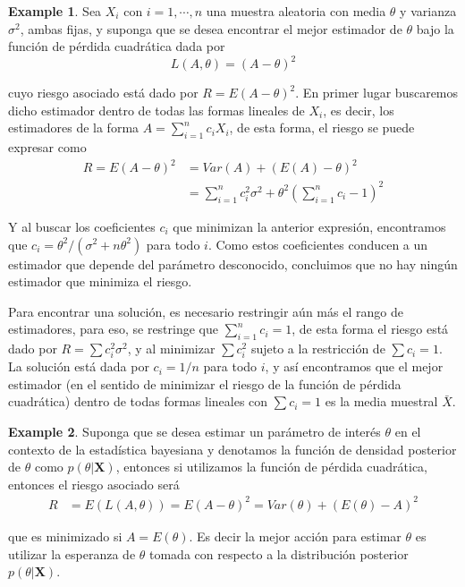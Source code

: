 \documentclass[
  spanish,
  letter]{book}
\theoremstyle{definition}
\theoremstyle{definition}
\newtheorem{example}{Example}[chapter]
\theoremstyle{definition}
\theoremstyle{remark}
\begin{document}
\begin{example}
\protect\hypertarget{exm:unnamed-chunk-1}{}{\label{exm:unnamed-chunk-1} }Sea \(X_i\) con \(i=1,\cdots, n\) una muestra aleatoria con media \(\theta\) y varianza \(\sigma^2\), ambas fijas, y suponga que se desea encontrar el mejor estimador de \(\theta\) bajo la función de pérdida cuadrática dada por
\begin{equation*}
L(A,\theta)=(A-\theta)^2
\end{equation*}

cuyo riesgo asociado está dado por \(R=E(A-\theta)^2\). En primer lugar buscaremos dicho estimador dentro de todas las formas lineales de \(X_i\), es decir, los estimadores de la forma \(A=\sum_{i=1}^nc_iX_i\), de esta forma, el riesgo se puede expresar como
\begin{align*}
R=E(A-\theta)^2&=Var(A)+(E(A)-\theta)^2\\
&=\sum_{i=1}^nc_i^2\sigma^2+\theta^2(\sum_{i=1}^nc_i-1)^2
\end{align*}

Y al buscar los coeficientes \(c_i\) que minimizan la anterior expresión, encontramos que \(c_i=\theta^2/(\sigma^2+n\theta^2)\) para todo \(i\). Como estos coeficientes conducen a un estimador que depende del parámetro desconocido, concluimos que no hay ningún estimador que minimiza el riesgo.

Para encontrar una solución, es necesario restringir aún más el rango de estimadores, para eso, se restringe que \(\sum_{i=1}^nc_i=1\), de esta forma el riesgo está dado por \(R=\sum c_i^2\sigma^2\), y al minimizar \(\sum c_i^2\) sujeto a la restricción de \(\sum c_i=1\). La solución está dada por \(c_i=1/n\) para todo \(i\), y así encontramos que el mejor estimador (en el sentido de minimizar el riesgo de la función de pérdida cuadrática) dentro de todas formas lineales con \(\sum c_i=1\) es la media muestral \(\bar{X}\).
\end{example}

\begin{example}
\protect\hypertarget{exm:unnamed-chunk-2}{}{\label{exm:unnamed-chunk-2} }Suponga que se desea estimar un parámetro de interés \(\theta\) en el contexto de la estadística bayesiana y denotamos la función de densidad posterior de \(\theta\) como \(p(\theta|\mathbf{X})\), entonces si utilizamos la función de pérdida cuadrática, entonces el riesgo asociado será
\begin{align*}
R&=E(L(A,\theta))=E (A-\theta)^2=Var(\theta)+(E(\theta)-A)^2
\end{align*}

que es minimizado si \(A=E(\theta)\). Es decir la mejor acción para estimar \(\theta\) es utilizar la esperanza de \(\theta\) tomada con respecto a la distribución posterior \(p(\theta|\mathbf{X})\).
\end{example}
\end{document}
